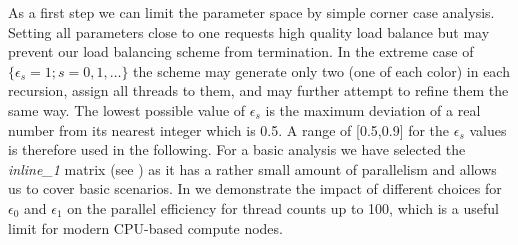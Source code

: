 As a first step we can limit the parameter space by simple corner case analysis. Setting all parameters close to one requests high quality load balance but may prevent our load balancing scheme from termination. In the extreme case of $\{\epsilon_s=1; s=0,1,\ldots\}$ the scheme may generate only two \levelGroups (one of each color) in each recursion, assign all threads to them, and may further attempt to refine them the same way.  The lowest possible value of $\epsilon_s$ is the maximum deviation of a real number from its nearest integer which is 0.5. A range of  [0.5,0.9] for the $\epsilon_s$ values is therefore used in the following. For a basic analysis we have selected the \emph{inline\_1} matrix (see ) as it has a rather small amount of parallelism and allows us to cover basic scenarios. In   we demonstrate the impact of different choices for $\epsilon_0$ and $\epsilon_1$ on the parallel efficiency for thread counts up to 100, which is a useful limit for modern CPU-based compute nodes. 
%
